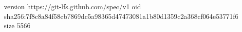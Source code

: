 version https://git-lfs.github.com/spec/v1
oid sha256:7f8c8a84f58cb7869dc5a98365d47473081a1b80d1359c2a368cf064e53771f6
size 5566
